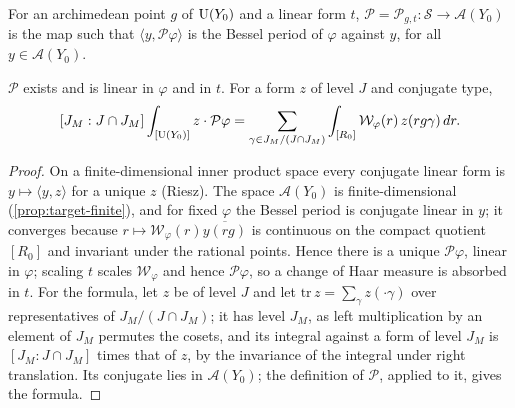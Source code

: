 \begin{definition}\label{def:poincare}
For an archimedean point $g$ of $\operatorname{U}(Y_0)$ and a linear form $t$, $\mathcal P=\mathcal P_{g,t}\colon\mathcal S\to\mathcal A(Y_0)$ is the
map such that $\langle y,\mathcal P\varphi\rangle$ is the Bessel period of $\varphi$ against $y$, for all $y\in\mathcal A(Y_0)$.
\end{definition}

\begin{proposition}\label{prop:poincare}
$\mathcal P$ exists and is linear in $\varphi$ and in $t$. For a form $z$ of level $J$ and conjugate type,
\[
  [J_M:J\cap J_M]\int_{[\operatorname{U}(Y_0)]}z\cdot\mathcal P\varphi=\sum_{\gamma\in J_M/(J\cap J_M)}\int_{[R_0]}\mathcal W_\varphi(r)\,z(rg\gamma)\,dr .
\]
\end{proposition}

\begin{proof}
On a finite-dimensional inner product space every conjugate linear form is $y\mapsto\langle y,z\rangle$ for a unique $z$ (Riesz). The space $\mathcal A(Y_0)$ is finite-dimensional (\cref{prop:target-finite}), and for fixed $\varphi$ the Bessel period is conjugate linear in $y$; it converges because $r\mapsto\mathcal W_\varphi(r)\overline{y(rg)}$ is continuous on the
compact quotient $[R_0]$ and invariant under the rational points. Hence there is a unique $\mathcal P\varphi$, linear in $\varphi$; scaling $t$ scales $\mathcal W_\varphi$ and hence $\mathcal P\varphi$, so a change of Haar measure is absorbed in $t$. For the formula, let $z$ be of level $J$ and let $\mathrm{tr}\,z=\sum_{\gamma}z(\cdot\gamma)$ over representatives of
$J_M/(J\cap J_M)$; it has level $J_M$, as left multiplication by an element of $J_M$ permutes the cosets, and its integral against a form of level $J_M$ is $[J_M:J\cap J_M]$ times that of $z$, by the invariance of the integral under right translation. Its conjugate lies in $\mathcal A(Y_0)$; the definition of $\mathcal P$, applied to it,
gives the formula.
\end{proof}
